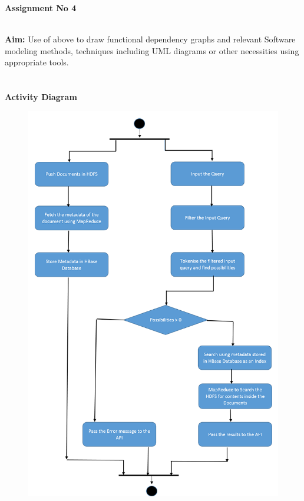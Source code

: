 \documentclass[11pt]{article}
\begin{document}
\noindent
\textbf{
	\large Assignment No 4 \\ \\
} 

\textbf{
	Aim:}
Use of above to draw functional dependency graphs and relevant Software modeling methods, techniques including UML diagrams or other necessities using appropriate tools. \\ \\ \\

\large \textbf{Activity Diagram}

\begin{figure}[h]
\includegraphics{activity_diagram}
\centering
\end{figure}
\end{document}
